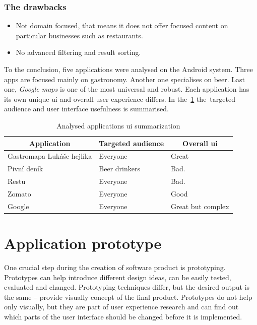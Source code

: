 \subsubsection{The drawbacks}
\begin{itemize}
    \item Not domain focused, that means it does not offer focused content on particular businesses such as restaurants.
    \item No advanced filtering and result sorting.
\end{itemize}

To the conclusion, five applications were analysed on the Android system. Three apps are focused mainly on gastronomy. Another one specialises on beer. Last one, \textit{Google maps} is one of the most universal and robust. 
Each application has its own unique \gls{ui} and overall user experience differs. In the~\cref{table:app-analysis} the~targeted audience and user interface usefulness is summarised.

\begin{table}[htbp]
\centering
\begin{tabular}{|l|l|l|}
\hline
\multicolumn{1}{|c|}{Application} & \multicolumn{1}{c|}{Targeted audience} & \multicolumn{1}{c|}{Overall \gls{ui}} \\ \hline
Gastromapa Lukáše hejlíka         & Everyone                               & Great                           \\ \hline
Pivní deník                       & Beer drinkers                          & Bad.                            \\ \hline
Restu                             & Everyone                               & Bad.                            \\ \hline
Zomato                            & Everyone                               & Good                            \\ \hline
Google                            & Everyone                               & Great but complex              \\ \hline
\end{tabular}
\caption{Analysed applications \gls{ui} summarization}
\label{table:app-analysis}
\end{table}

\section{Application prototype}
One crucial step during the creation of software product is prototyping. Prototypes can help introduce different design ideas, can be easily tested, evaluated and changed. Prototyping techniques differ, but the desired output is the same -- provide visually concept of the final product. Prototypes do not help only visually, but they are part of user experience research and can find out which parts of the user interface should be changed before it is implemented.

